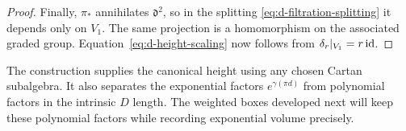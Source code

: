 \begin{proof}
Finally, $\pi_*$ annihilates $\mathfrak d^2$, so in the splitting
\eqref{eq:d-filtration-splitting} it depends only on $V_1$.
The same projection is a homomorphism on the associated graded group.
Equation~\eqref{eq:d-height-scaling} now follows from
$\delta_r|_{V_1}=r\operatorname{id}$.
\end{proof}

The construction supplies the canonical height using any chosen Cartan
subalgebra.  It also separates the exponential factors
$e^{\gamma(\pi d)}$ from polynomial factors in the intrinsic $D$ length.
The weighted boxes developed next will keep these polynomial factors
while recording exponential volume precisely.
